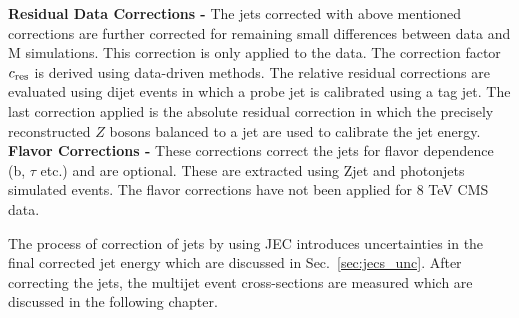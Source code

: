 {\bf Residual Data Corrections -} The jets corrected with above mentioned corrections are further corrected for remaining small differences between data and M simulations. This correction is only applied to the data. The correction factor $c_{\rm res}$ is derived using data-driven methods. The relative residual corrections are evaluated using dijet events in which a probe jet is calibrated using a tag jet. The last correction applied is the absolute residual correction in which the precisely reconstructed $Z$ bosons balanced to a jet are used to calibrate the jet energy. \\ \newline
{\bf Flavor Corrections -} These corrections correct the jets for flavor dependence (b, $\tau$ etc.) and are optional. These are extracted using Z\plusn jet and photon\plusn jets simulated events. The flavor corrections have not been applied for 8 TeV CMS data.

The process of correction of jets by using JEC introduces uncertainties in the final corrected jet energy which are discussed in Sec.~\ref{sec:jecs_unc}. After correcting the jets, the multijet event cross-sections are measured which are discussed in the following chapter.
